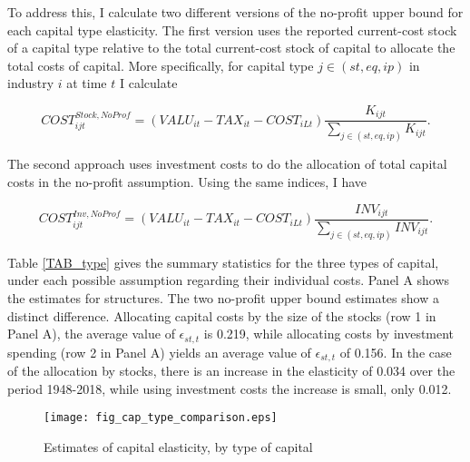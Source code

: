 \documentclass[11pt]{article}
\begin{document}
To address this, I calculate two different versions of the no-profit upper bound for each capital type elasticity. The first version uses the reported current-cost stock of a capital type relative to the total current-cost stock of capital to allocate the total costs of capital. More specifically, for capital type $j \in (st,eq,ip)$ in industry $i$ at time $t$ I calculate

\begin{equation}
	COST_{ijt}^{Stock,NoProf} = \left(VALU_{it} - TAX_{it} - COST_{iLt}\right)\frac{K_{ijt}}{\sum_{j \in (st,eq,ip)} K_{ijt}}.
\end{equation}

The second approach uses investment costs to do the allocation of total capital costs in the no-profit assumption. Using the same indices, I have

\begin{equation}
	COST_{ijt}^{Inv,NoProf} = \left(VALU_{it} - TAX_{it} - COST_{iLt}\right)\frac{INV_{ijt}}{\sum_{j \in (st,eq,ip)} INV_{ijt}}.
\end{equation}

Table \ref{TAB_type} gives the summary statistics for the three types of capital, under each possible assumption regarding their individual costs. Panel A shows the estimates for structures. The two no-profit upper bound estimates show a distinct difference. Allocating capital costs by the size of the stocks (row 1 in Panel A), the average value of $\epsilon_{st,t}$ is 0.219, while allocating costs by investment spending (row 2 in Panel A) yields an average value of $\epsilon_{st,t}$ of 0.156. In the case of the allocation by stocks, there is an increase in the elasticity of 0.034 over the period 1948-2018, while using investment costs the increase is small, only 0.012.

\begin{figure}[!htb]
\begin{center}
\caption{Estimates of capital elasticity, by type of capital}
\label{FIG_cap_types}
\texttt{[image: fig\_cap\_type\_comparison.eps]}
\end{center}
\vspace{-.5cm}
\end{figure}
\end{document}
